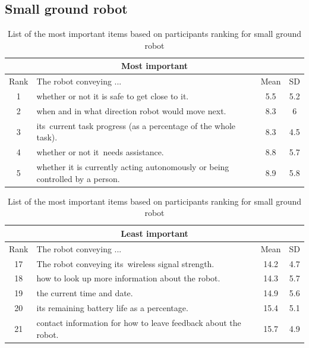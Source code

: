 \documentclass[letterpaper, 10 pt, conference]{ieeeconf}  %
\begin{document}
\subsection{Small ground robot}


\begin {table}
\begin{center}
\label{table:turtlebot}
\begin{tabular}{|c|p{160pt}|c|c|}
 \hline
 \multicolumn{4}{|c|}{Most important} \\
 \hline
  Rank & The robot conveying ... & Mean & SD \\
 \hline
 \rowcolor{Gray}
1 & whether or not it is safe to get close to it. & 5.5 & 5.2\\
\hline
2 & when and in what direction robot would move next. & 8.3 & 6\\
\hline
3 & its current task progress (as a percentage of the whole task). & 8.3 & 4.5\\
\hline
4 & whether or not it needs assistance. & 8.8 & 5.7\\
\hline
5 & whether it is currently acting autonomously or being controlled by a person. & 8.9 & 5.8\\
\hline
\end{tabular}

\vspace*{0.5 cm}

\begin{tabular}{|c|p{160pt}|c|c|}
 \hline
  \multicolumn{4}{|c|}{Least important} \\
 \hline
  Rank & The robot conveying ... & Mean & SD \\
 \hline
    \rowcolor{Gray}
17 & The robot conveying its wireless signal strength. & 14.2 & 4.7\\
\hline
   \rowcolor{Gray}
18 & how to look up more information about the robot. & 14.3 & 5.7\\
\hline
   \rowcolor{Gray}
19 & the current time and date. & 14.9 & 5.6\\
\hline
   \rowcolor{Gray}
20 & its remaining battery life as a percentage. & 15.4 & 5.1\\
\hline
   \rowcolor{Gray}
21 & contact information for how to leave feedback about the robot. & 15.7 & 4.9\\
\hline
\end{tabular}
\end{center}

\caption{List of the most important items based on participants ranking for small ground robot}
\end{table}
\end{document}
